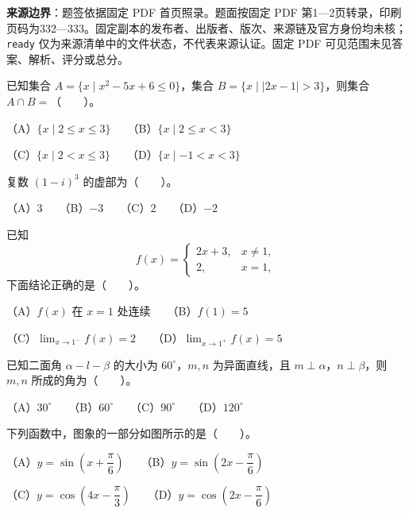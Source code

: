 

\begin{gktip}
\textbf{来源边界}：题签依据固定 PDF 首页照录。题面按固定 PDF 第1—2页转录，印刷页码为332—333。固定副本的发布者、出版者、版次、来源链及官方身份均未核；\texttt{ready} 仅为来源清单中的文件状态，不代表来源认证。固定 PDF 可见范围未见答案、解析、评分或总分。
\end{gktip}


\begin{question}
已知集合 $A=\{x\mid x^2-5x+6\leqslant0\}$，集合 $B=\{x\mid |2x-1|>3\}$，则集合 $A\cap B=$\mbox{（　　）}。

（A）$\{x\mid 2\leqslant x\leqslant3\}$　　（B）$\{x\mid 2\leqslant x<3\}$

（C）$\{x\mid 2<x\leqslant3\}$　　（D）$\{x\mid -1<x<3\}$

\end{question}
\begin{question}
复数 $(1-i)^3$ 的虚部为\mbox{（　　）}。

（A）$3$　　（B）$-3$　　（C）$2$　　（D）$-2$

\end{question}
\begin{question}
已知
\nopagebreak[4]
\[
f(x)=
\begin{cases}
2x+3,&x\ne1,\\
2,&x=1,
\end{cases}
\]
下面结论正确的是\mbox{（　　）}。

（A）$f(x)$ 在 $x=1$ 处连续　　（B）$f(1)=5$

（C）$\displaystyle\lim_{x\to1^-}f(x)=2$　　（D）$\displaystyle\lim_{x\to1^+}f(x)=5$

\end{question}
\begin{question}
已知二面角 $\alpha-l-\beta$ 的大小为 $60^\circ$，$m,n$ 为异面直线，且 $m\perp\alpha$，$n\perp\beta$，则 $m,n$ 所成的角为\mbox{（　　）}。

（A）$30^\circ$　　（B）$60^\circ$　　（C）$90^\circ$　　（D）$120^\circ$

\Needspace{0.4\textheight}
\end{question}
\begin{question}
下列函数中，图象的一部分如图所示的是\mbox{（　　）}。
\nopagebreak[4]
\begin{center}\end{center}
\nopagebreak[4]
（A）$y=\sin\left(x+\dfrac\pi6\right)$　　（B）$y=\sin\left(2x-\dfrac\pi6\right)$

（C）$y=\cos\left(4x-\dfrac\pi3\right)$　　（D）$y=\cos\left(2x-\dfrac\pi6\right)$

\end{question}
